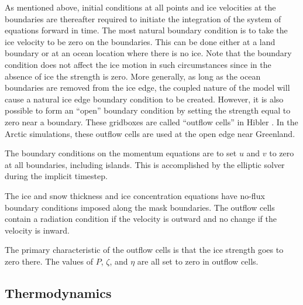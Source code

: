 As mentioned above, initial conditions at all points and ice
velocities at the boundaries are thereafter required to initiate the
integration of the system of equations forward in time.  The most
natural boundary condition is to take the ice velocity to be zero on
the boundaries.  This can be done either at a land boundary or at an
ocean location where there is no ice.  Note that the boundary
condition does not affect the ice motion in such circumstances since
in the absence of ice the strength is zero.  More generally, as long
as the ocean boundaries are removed from the ice edge, the coupled
nature of the model will cause a natural ice edge boundary condition
to be created.  However, it is also possible to form an ``open''
boundary condition by setting the strength equal to zero near a
boundary.  These gridboxes are called ``outflow cells'' in Hibler
\cite{Hibler79}.  In the Arctic simulations, these outflow cells
are used at the open edge near Greenland.

The boundary conditions on the momentum equations are to set $u$ and $v$
to zero at all boundaries, including islands.  This is accomplished
by the elliptic solver during the implicit timestep.

The ice and snow thickness and ice concentration equations have no-flux
boundary conditions imposed along the mask boundaries.  The outflow
cells contain a radiation condition if the velocity is outward and no
change if the velocity is inward.

The primary characteristic of the outflow cells is that the ice
strength goes to zero there.  The values of $P$, $\zeta$, and $\eta$
are all set to zero in outflow cells.

\subsection{Thermodynamics}
\label{Growth}

